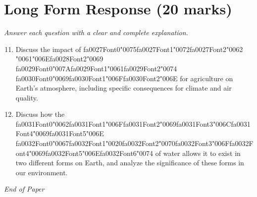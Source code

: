 \documentclass[12pt]{article}
\begin{document}
\section*{Long Form Response (20 marks)}
\textit{Answer each question with a clear and complete explanation.}
\begin{enumerate}[label=\arabic*.]
\setcounter{enumi}{10}
\item Discuss the impact of {\csname fa0027Font0\endcsname\char"0075}{\csname fa0027Font1\endcsname\char"0072}{\csname fa0027Font2\endcsname\char"0062} {\char"0061}{\char"006E}{\csname fa0028Font2\endcsname\char"0069} {\csname fa0029Font0\endcsname\char"007A}{\csname fa0029Font1\endcsname\char"0061}{\csname fa0029Font2\endcsname\char"0074} {\csname fa0030Font0\endcsname\char"0069}{\csname fa0030Font1\endcsname\char"006F}{\csname fa0030Font2\endcsname\char"006E} for agriculture on Earth's
atmosphere, including specific consequences for climate and air quality.
\item Discuss how the {\csname fa0031Font0\endcsname\char"0062}{\csname fa0031Font1\endcsname\char"006F}{\csname fa0031Font2\endcsname\char"0069}{\csname fa0031Font3\endcsname\char"006C}{\csname fa0031Font4\endcsname\char"0069}{\csname fa0031Font5\endcsname\char"006E} {\csname fa0032Font0\endcsname\char"0067}{\csname fa0032Font1\endcsname\char"0020}{\csname fa0032Font2\endcsname\char"0070}{\csname fa0032Font3\endcsname\char"006F}{\csname fa0032Font4\endcsname\char"0069}{\csname fa0032Font5\endcsname\char"006E}{\csname fa0032Font6\endcsname\char"0074} of water allows it to exist in two different forms on
Earth, and analyze the significance of these forms in our environment.
\end{enumerate}

\vfill
\noindent\textit{End of Paper}
\end{document}

